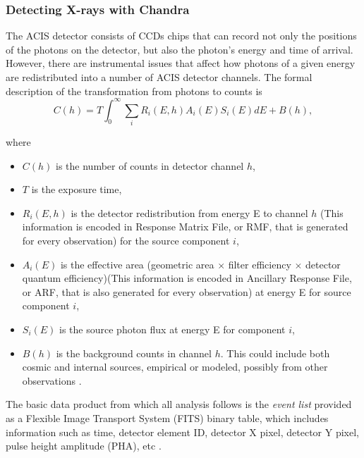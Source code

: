 \subsubsection{Detecting X-rays with Chandra}
The ACIS detector consists of CCDs chips that can record not only the positions of the photons on the detector, but also the photon's energy and time of arrival. However, there are instrumental issues that affect how photons of a given energy are redistributed into a number of ACIS detector channels. The formal description of the transformation from photons to counts is
\begin{equation}
    C(h) = T\int_0^{\infty}\sum_i R_i (E, h)A_i(E)S_i(E)dE + B(h),
\end{equation}

where 
\begin{itemize}
    \item $C(h)$ is the number of counts in detector channel $h$, \item $T$ is the exposure time,
    \item $R_i(E,h)$ is the detector redistribution from energy E to channel $h$ (This information is encoded in Response Matrix File, or RMF, that is generated for every observation) for the source component $i$,
    \item  $A_i(E)$ is the effective area (geometric area $\times$ filter efficiency $\times$ detector quantum efficiency)(This information is encoded in Ancillary Response File, or ARF, that is also generated for every observation) at energy E for source component $i$,
    \item $S_i(E)$ is the source photon flux at energy E for component $i$,
    \item $B(h)$ is the background counts in channel $h$. This could include both cosmic and internal sources, empirical or modeled, possibly from other observations \citep{Huenemoerder_lec_2011}.
\end{itemize} 

The basic data product from which all analysis follows is the \textit{event list} provided as a Flexible Image Transport System (FITS) binary table, which includes information such as time, detector element ID, detector X pixel, detector Y pixel, pulse height amplitude (PHA), etc \citep{Huenemoerder_lec_2011}.\par



